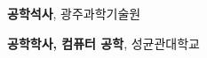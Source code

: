 %
%
%


\begin{scholarship}
	{\textbf{공학석사}, 광주과학기술원}
					
	{\textbf{공학학사, 컴퓨터 공학}, 성균관대학교}
	
\end{scholarship}